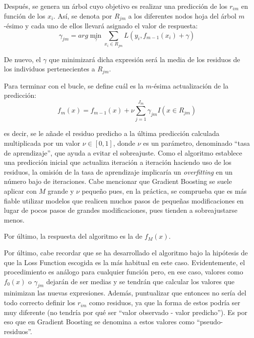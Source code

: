 \documentclass[12pt,twoside]{article}
\begin{document}
Después, se genera un árbol cuyo objetivo es realizar una predicción de los $r_{im}$ en función de los $x_i$. Así, se denota por $R_{jm}$ a los diferentes nodos hoja del árbol $m$-ésimo y cada uno de ellos llevará asignado el valor de respuesta:
\begin{equation*}
\gamma_{jm} = arg\min_{\gamma} \sum_{x_i \in R_{jm}} L(y_i, f_{m-1}(x_i) + \gamma)
\end{equation*}

De nuevo, el $\gamma$ que minimizará dicha expresión será la media de los residuos de los individuos pertenecientes a $R_{jm}$. 

Para terminar con el bucle, se define cuál es la $m$-ésima actualización de la predicción:
\begin{equation*}
f_m(x) = f_{m-1}(x) + \nu \sum_{j = 1}^{J_m}\gamma_{jm} I(x \in R_{jm})
\end{equation*}

\noindent
es decir, se le añade el residuo predicho a la última predicción calculada multiplicada por un valor $\nu \in [0, 1]$, donde $\nu$ es un parámetro, denominado ``tasa de aprendizaje'', que ayuda a evitar el sobreajuste. Como el algoritmo establece una predicción inicial que actualiza iteración a iteración haciendo uso de los residuos, la omisión de la tasa de aprendizaje implicaría un \textit{overfitting} en un número bajo de iteraciones. Cabe mencionar que Gradient Boosting se suele aplicar con $M$ grande y $\nu$ pequeño pues, en la práctica, se comprueba que es más fiable utilizar modelos que realicen muchos pasos de pequeñas modificaciones en lugar de pocos pasos de grandes modificaciones, pues tienden a sobreajustarse menos.

Por último, la respuesta del algoritmo es la de $f_M(x)$.

Por último, cabe recordar que se ha desarrollado el algoritmo bajo la hipótesis de que la Loss Function escogida es la más habitual en este caso. Evidentemente, el procedimiento es análogo para cualquier función pero, en ese caso, valores como $f_0(x)$ o $\gamma_{jm}$ dejarán de ser medias y se tendrán que calcular los valores que minimizan las nuevas expresiones. Además, puntualizar que entonces no sería del todo correcto definir los $r_{im}$ como residuos, ya que la forma de estos podría ser muy diferente (no tendría por qué ser ``valor observado - valor predicho''). Es por eso que en Gradient Boosting se denomina a estos valores como ``pseudo-residuos''.
\end{document}
